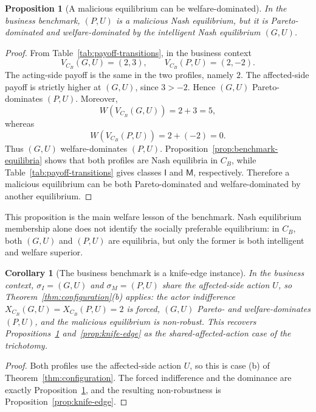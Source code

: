 \documentclass[a4paper,fleqn]{cas-dc}
\newtheorem{proposition}[definition]{Proposition}
\newtheorem{corollary}[definition]{Corollary}
\theoremstyle{remark}
\newcommand{\Iclass}{\mathsf{I}}
\newcommand{\Mclass}{\mathsf{M}}
\begin{document}
\begin{proposition}[A malicious equilibrium can be welfare-dominated]
\label{prop:malicious-welfare-dominated}
In the business benchmark, $(P,U)$ is a malicious Nash equilibrium, but it is Pareto-dominated and welfare-dominated by the intelligent Nash equilibrium $(G,U)$.
\end{proposition}

\begin{proof}
From Table~\ref{tab:payoff-transitions}, in the business context
\[
V_{C_B}(G,U)=(2,3),\qquad V_{C_B}(P,U)=(2,-2).
\]
The acting-side payoff is the same in the two profiles, namely $2$. The affected-side payoff is strictly higher at $(G,U)$, since $3>-2$. Hence $(G,U)$ Pareto-dominates $(P,U)$. Moreover,
\[
W(V_{C_B}(G,U))=2+3=5,
\]
whereas
\[
W(V_{C_B}(P,U))=2+(-2)=0.
\]
Thus $(G,U)$ welfare-dominates $(P,U)$. Proposition~\ref{prop:benchmark-equilibria} shows that both profiles are Nash equilibria in $C_B$, while Table~\ref{tab:payoff-transitions} gives classes $\Iclass$ and $\Mclass$, respectively. Therefore a malicious equilibrium can be both Pareto-dominated and welfare-dominated by another equilibrium.
\end{proof}

This proposition is the main welfare lesson of the benchmark. Nash equilibrium membership alone does not identify the socially preferable equilibrium: in $C_B$, both $(G,U)$ and $(P,U)$ are equilibria, but only the former is both intelligent and welfare superior.

\begin{corollary}[The business benchmark is a knife-edge instance]
\label{cor:business-knife-edge}
In the business context, $\sigma_I=(G,U)$ and $\sigma_M=(P,U)$ share the affected-side action $U$, so Theorem~\ref{thm:configuration}(b) applies: the actor indifference $X_{C_B}(G,U)=X_{C_B}(P,U)=2$ is forced, $(G,U)$ Pareto- and welfare-dominates $(P,U)$, and the malicious equilibrium is non-robust. This recovers Propositions~\ref{prop:malicious-welfare-dominated} and~\ref{prop:knife-edge} as the shared-affected-action case of the trichotomy.
\end{corollary}

\begin{proof}
Both profiles use the affected-side action $U$, so this is case (b) of Theorem~\ref{thm:configuration}. The forced indifference and the dominance are exactly Proposition~\ref{prop:malicious-welfare-dominated}, and the resulting non-robustness is Proposition~\ref{prop:knife-edge}.
\end{proof}
\end{document}
